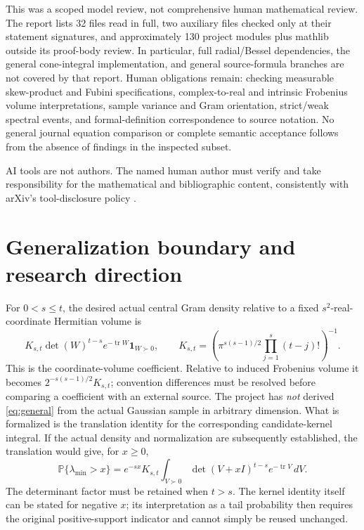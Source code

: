 \documentclass[11pt]{article}
\newcommand{\Prob}{\mathbb P}
\newcommand{\tr}{\operatorname{tr}}
\newcommand{\pd}{\succ0}
\begin{document}
This was a scoped model review, not comprehensive human mathematical review.
The report lists 32 files read in full, two auxiliary files checked only at
their statement signatures, and approximately 130 project modules plus mathlib
outside its proof-body review. In particular, full radial/Bessel dependencies,
the general cone-integral implementation, and general source-formula branches
are not covered by that report. Human obligations remain: checking measurable
skew-product and Fubini specifications, complex-to-real and intrinsic Frobenius
volume interpretations, sample variance and Gram orientation, strict/weak
spectral events, and formal-definition correspondence to source notation.
No general journal equation comparison or complete semantic acceptance follows
from the absence of findings in the inspected subset.

AI tools are not authors. The named human author must verify and take
responsibility for the mathematical and bibliographic content, consistently
with arXiv's tool-disclosure policy \cite{arxivpolicy}.

\section{Generalization boundary and research direction}\label{sec:future}
For $0<s\leq t$, the desired actual central Gram density relative to a fixed
$s^2$-real-coordinate Hermitian volume is
\begin{equation}\label{eq:general}
 K_{s,t}\det(W)^{t-s}e^{-\tr W}\mathbf1_{W\pd},\qquad
 K_{s,t}=\left(\pi^{s(s-1)/2}\prod_{j=1}^s(t-j)!\right)^{-1}.
\end{equation}
This is the coordinate-volume coefficient. Relative to induced Frobenius
volume it becomes $2^{-s(s-1)/2}K_{s,t}$; convention differences must be
resolved before comparing a coefficient with an external source.
The project has \emph{not} derived \eqref{eq:general} from the actual Gaussian
sample in arbitrary dimension. What is formalized is the translation identity
for the corresponding candidate-kernel integral. If the actual density and
normalization are subsequently established, the translation would give, for
$x\geq0$,
\[
 \Prob\{\lambda_{\min}>x\}
 =e^{-sx}K_{s,t}\int_{V\pd}
                \det(V+xI)^{t-s}e^{-\tr V}\,dV.
\]
The determinant factor must be retained when $t>s$. The kernel identity itself
can be stated for negative $x$; its interpretation as a tail probability then
requires the original positive-support indicator and cannot simply be reused
unchanged.
\end{document}
